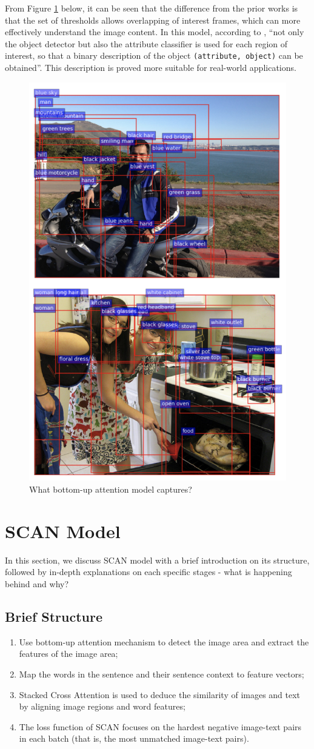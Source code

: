 From Figure \ref{fig:bottomup} below, it can be seen that the difference from the prior works is that the set of thresholds allows overlapping of interest frames, which can more effectively understand the image content. In this model, according to \cite{bottomup}, ``not only the object detector but also the attribute classifier is used for each region of interest, so that a binary description of the object \verb|(attribute, object)| can be obtained''. This description is proved more suitable for real-world applications.

\begin{figure}[h!]
\centering
\includegraphics[width=.5\textwidth]{bottomup.pdf}
\caption{What bottom-up attention model captures? \cite{bottomup}}
\label{fig:bottomup}
\end{figure}

\section{SCAN Model}
In this section, we discuss SCAN model with a brief introduction on its structure, followed by in-depth explanations on each specific stages - what is happening behind and why?

\subsection{Brief Structure}
\begin{enumerate}
    \item Use bottom-up attention mechanism \cite{bottomup} to detect the image area and extract the features of the image area;
    \item Map the words in the sentence and their sentence context to feature vectors;
    \item Stacked Cross Attention is used to deduce the similarity of images and text by aligning image regions and word features;
    \item The loss function of SCAN focuses on the hardest negative image-text pairs in each batch (that is, the most unmatched image-text pairs).
\end{enumerate}

